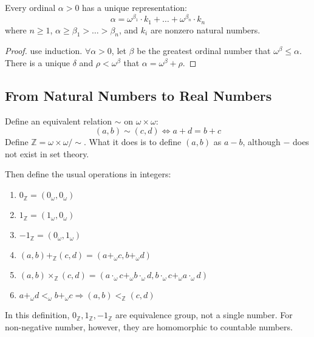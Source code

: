 \begin{theorem}
    Every ordinal $\alpha > 0$ has a unique representation:
    \begin{equation}
        \alpha = \omega^{\beta_1} \cdot k_1 + \dots + \omega^{\beta_n} \cdot k_n
    \end{equation}
    where $n \geq 1$, $\alpha \geq \beta_1 > \dots > \beta_n$, and $k_i$ are nonzero natural numbers.
\end{theorem}
\begin{proof}
    use induction. $\forall \alpha > 0$, let $\beta$ be the greatest ordinal number that $\omega^\beta \leq \alpha$. There is a unique $\delta$ and $\rho < \omega^\beta$ that $\alpha = \omega^\beta + \rho$. 
\end{proof}


\subsection{From Natural Numbers to Real Numbers}

\begin{definition}[integers]
Define an equivalent relation $\sim$ on $\omega \times \omega$: 
\begin{equation}
    (a,b) \sim (c,d) \Leftrightarrow a + d = b + c
\end{equation}
Define $\mathbb{Z} = \omega \times \omega / \sim$. What it does is to define $(a,b)$ as $a - b$, although $-$ does not exist in set theory.
\end{definition}

Then define the usual operations in integers:
\begin{enumerate}
    \item $0_\mathbb{Z} = (0_\omega , 0_\omega)$
    \item $1_\mathbb{Z} = (1_\omega , 0_\omega)$
    \item ${-1}_\mathbb{Z} = (0_\omega, 1_\omega)$
    \item $(a,b) +_{\mathbb{Z}} (c,d) = (a +_\omega c, b +_\omega d)$
    \item $(a,b) {\times}_{\mathbb{Z}} (c,d) = (a \cdot_\omega c +_\omega b \cdot_\omega d, b \cdot_\omega c +_\omega a \cdot_\omega d)$
    \item $a +_\omega d <_\omega b +_\omega c \Rightarrow (a,b) <_{\mathbb{Z}} (c,d)$
\end{enumerate}

In this definition, $0_\mathbb{Z},1_\mathbb{Z},{-1}_\mathbb{Z}$ are equivalence group, not a single number. For non-negative number, however, they are homomorphic to countable numbers.


